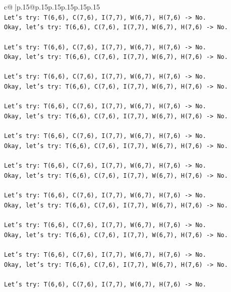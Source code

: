 \documentclass{article}
\begin{document}
{\begin{supertabular}{c@{$\;$}|p{.15\linewidth}@{}p{.15\linewidth}p{.15\linewidth}p{.15\linewidth}p{.15\linewidth}p{.15\linewidth}}
{{{\\ 
\texttt{Let's try: T(6,6), C(7,6), I(7,7), W(6,7), H(7,6) {-}> No.} \\
\texttt{Okay, let's try: T(6,6), C(7,6), I(7,7), W(6,7), H(7,6) {-}> No.} \\
\\ 
\texttt{Let's try: T(6,6), C(7,6), I(7,7), W(6,7), H(7,6) {-}> No.} \\
\texttt{Okay, let's try: T(6,6), C(7,6), I(7,7), W(6,7), H(7,6) {-}> No.} \\
\\ 
\texttt{Let's try: T(6,6), C(7,6), I(7,7), W(6,7), H(7,6) {-}> No.} \\
\texttt{Okay, let's try: T(6,6), C(7,6), I(7,7), W(6,7), H(7,6) {-}> No.} \\
\\ 
\texttt{Let's try: T(6,6), C(7,6), I(7,7), W(6,7), H(7,6) {-}> No.} \\
\texttt{Okay, let's try: T(6,6), C(7,6), I(7,7), W(6,7), H(7,6) {-}> No.} \\
\\ 
\texttt{Let's try: T(6,6), C(7,6), I(7,7), W(6,7), H(7,6) {-}> No.} \\
\texttt{Okay, let's try: T(6,6), C(7,6), I(7,7), W(6,7), H(7,6) {-}> No.} \\
\\ 
\texttt{Let's try: T(6,6), C(7,6), I(7,7), W(6,7), H(7,6) {-}> No.} \\
\texttt{Okay, let's try: T(6,6), C(7,6), I(7,7), W(6,7), H(7,6) {-}> No.} \\
\\ 
\texttt{Let's try: T(6,6), C(7,6), I(7,7), W(6,7), H(7,6) {-}> No.} \\
\texttt{Okay, let's try: T(6,6), C(7,6), I(7,7), W(6,7), H(7,6) {-}> No.} \\
\\ 
\texttt{Let's try: T(6,6), C(7,6), I(7,7), W(6,7), H(7,6) {-}> No.} \\
\texttt{Okay, let's try: T(6,6), C(7,6), I(7,7), W(6,7), H(7,6) {-}> No.} \\
\\ 
\texttt{Let's try: T(6,6), C(7,6), I(7,7), W(6,7), H(7,6) {-}> No.} \\
\texttt{Okay, let's try: T(6,6), C(7,6), I(7,7), W(6,7), H(7,6) {-}> No.} \\
\\ 
\texttt{Let's try: T(6,6), C(7,6), I(7,7), W(6,7), H(7,6) {-}> No.} \\
}}}
\end{supertabular}}
\end{document}
